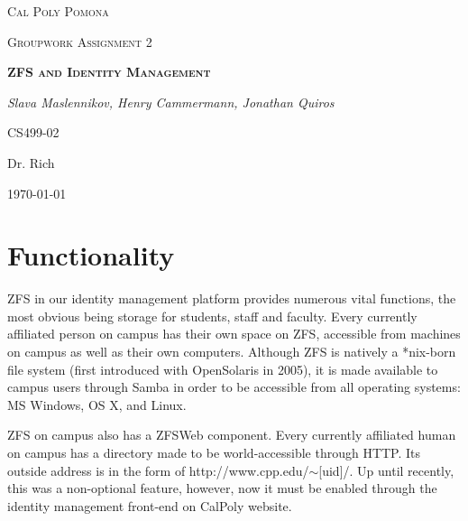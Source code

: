 \documentclass[letterpaper,12pt,titlepage]{article}
\date{Monday, March 7th 2016}
\author{Slava Maslennikov \and Henry Ammermann \and Jonathan Quiros}
\begin{document}

\begin{titlepage}
\centering
{\scshape\LARGE Cal Poly Pomona\par}
\vspace{1cm}
{\scshape\Large Groupwork Assignment 2\par}
\vspace{1.5cm}
{\scshape\bfseries ZFS and Identity Management\par}
\vspace{2cm}
{\Large\itshape Slava Maslennikov, Henry Cammermann, Jonathan Quiros\par}
\vfill
CS499-02\par
Dr. Rich
\vfill
{\large \today\par}
\end{titlepage}

\tableofcontents

%

\section{Functionality}
ZFS in our identity management platform provides numerous vital functions, the most obvious being storage for students, staff and faculty. Every currently affiliated person on campus has their own space on ZFS, accessible from machines on campus as well as their own computers. Although ZFS is natively a *nix-born file system (first introduced with OpenSolaris in 2005), it is made available to campus users through Samba in order to be accessible from all operating systems: MS Windows, OS X, and Linux. 

ZFS on campus also has a ZFSWeb component. Every currently affiliated human on campus has a directory made to be world-accessible through HTTP. Its outside address is in the form of http://www.cpp.edu/$\sim$[uid]/. Up until recently, this was a non-optional feature, however, now it must be enabled through the identity management front-end on CalPoly website.
\end{document}
